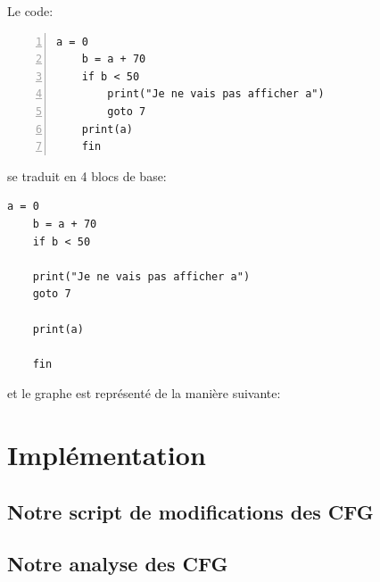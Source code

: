 Le code:
\begin{lstlisting}[numbers=left, xleftmargin=.35\textwidth]
    a = 0
    b = a + 70
    if b < 50
        print("Je ne vais pas afficher a")
        goto 7
    print(a)
    fin
\end{lstlisting}
se traduit en 4 blocs de base:
\begin{lstlisting}[xleftmargin=.35\textwidth]
    a = 0
    b = a + 70
    if b < 50

    print("Je ne vais pas afficher a")
    goto 7

    print(a)

    fin
\end{lstlisting}
et le graphe est représenté de la manière suivante:
\begin{center}
\end{center}
\section{Implémentation}
\subsection{Notre script de modifications des CFG}
\subsection{Notre analyse des CFG}